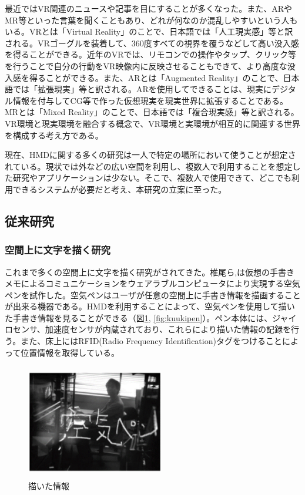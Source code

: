 \documentclass[11pt,a4j, titlepage]{jarticle} %
\begin{document}
最近ではVR関連のニュースや記事を目にすることが多くなった。また、ARやMR等といった言葉を聞くこともあり、どれが何なのか混乱しやすいという人もいる。VRとは「Virtual Reality」のことで、日本語では「人工現実感」等と訳される。VRゴーグルを装着して、360度すべての視界を覆うなどして高い没入感を得ることができる。近年のVRでは、リモコンでの操作やタップ、クリック等を行うことで自分の行動をVR映像内に反映させることもできて、より高度な没入感を得ることができる。また、ARとは「Augmented Reality」のことで、日本語では「拡張現実」等と訳される。ARを使用してできることは、現実にデジタル情報を付与してCG等で作った仮想現実を現実世界に拡張することである。MRとは「Mixed Reality」のことで、日本語では「複合現実感」等と訳される。VR環境と現実環境を融合する概念で、VR環境と実環境が相互的に関連する世界を構成する考え方である。

現在、HMDに関する多くの研究は一人で特定の場所において使うことが想定されている。現状では外などの広い空間を利用し、複数人で利用することを想定した研究やアプリケーションは少ない。そこで、複数人で使用できて、どこでも利用できるシステムが必要だと考え、本研究の立案に至った。

\subsection{従来研究}
\subsubsection{空間上に文字を描く研究}
これまで多くの空間上に文字を描く研究がされてきた。椎尾ら\cite{siio},\cite{siio2}は仮想の手書きメモによるコミュニケーションをウェアラブルコンピュータにより実現する空気ペンを試作した。空気ペンはユーザが任意の空間上に手書き情報を描画することが出来る機器である。HMDを利用することによって、空気ペンを使用して描いた手書き情報を見ることができる（図\ref{fig:tegakijouhou}, \ref{fig:kuukipen}）。ペン本体には、ジャイロセンサ、加速度センサが内蔵されており、これらにより描いた情報の記録を行う。また、床上にはRFID(Radio Frequency Identification)タグをつけることによって位置情報を取得している。

\begin{figure}[H]
  \begin{center}
    \includegraphics[clip,height=5.0cm,width=6.0cm]{./tegakijouhou.eps}
    \caption{描いた情報}
    \label{fig:tegakijouhou}
  \end{center}
\end{figure}
\end{document}
